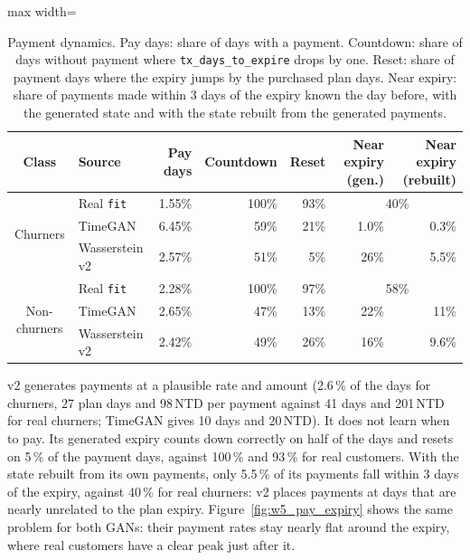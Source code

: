 \documentclass{article}
\begin{document}
\begin{table}[H]
\centering
\renewcommand{\arraystretch}{1.3}
\begin{adjustbox}{max width=\textwidth}
\begin{tabular}{|c|l|r|r|r|r|r|}
\hline
\textbf{Class} & \textbf{Source} & \textbf{Pay days} & \textbf{Countdown} & \textbf{Reset} & \textbf{Near expiry (gen.)} & \textbf{Near expiry (rebuilt)} \\ \hline
\multirow{3}{*}{Churners} & Real \texttt{fit} & 1.55\% & 100\% & 93\% & \multicolumn{2}{c|}{40\%} \\ \cline{2-7}
 & TimeGAN & 6.45\% & 59\% & 21\% & 1.0\% & 0.3\% \\ \cline{2-7}
 & Wasserstein v2 & 2.57\% & 51\% & 5\% & 26\% & 5.5\% \\ \hline
\multirow{3}{*}{Non-churners} & Real \texttt{fit} & 2.28\% & 100\% & 97\% & \multicolumn{2}{c|}{58\%} \\ \cline{2-7}
 & TimeGAN & 2.65\% & 47\% & 13\% & 22\% & 11\% \\ \cline{2-7}
 & Wasserstein v2 & 2.42\% & 49\% & 26\% & 16\% & 9.6\% \\ \hline
\end{tabular}
\end{adjustbox}
\caption{Payment dynamics. Pay days: share of days with a payment. Countdown: share of days without payment where \texttt{tx\_days\_to\_expire} drops by one. Reset: share of payment days where the expiry jumps by the purchased plan days. Near expiry: share of payments made within 3 days of the expiry known the day before, with the generated state and with the state rebuilt from the generated payments.}
\label{tab:w5_domain}
\end{table}

v2 generates payments at a plausible rate and amount (2.6\,\% of the days for churners, 27 plan days and 98\,NTD per payment against 41 days and 201\,NTD for real churners; TimeGAN gives 10 days and 20\,NTD). It does not learn when to pay. Its generated expiry counts down correctly on half of the days and resets on 5\,\% of the payment days, against 100\,\% and 93\,\% for real customers. With the state rebuilt from its own payments, only 5.5\,\% of its payments fall within 3 days of the expiry, against 40\,\% for real churners: v2 places payments at days that are nearly unrelated to the plan expiry. Figure~\ref{fig:w5_pay_expiry} shows the same problem for both GANs: their payment rates stay nearly flat around the expiry, where real customers have a clear peak just after it.
\end{document}

